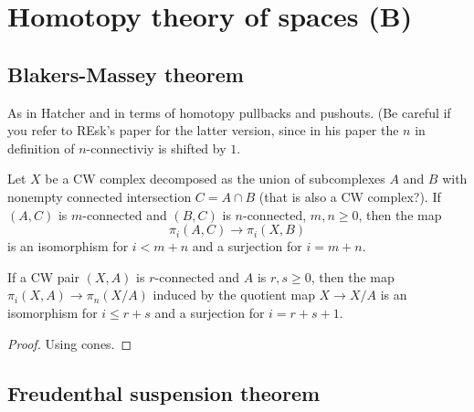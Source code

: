 \section{Homotopy theory of spaces (B)}
\label{section-homotopy-theory-of-spaces-b}

\subsection{Blakers-Massey theorem}
\label{subsection-blakers-massey-theorem}

As in Hatcher and in terms of homotopy
pullbacks and pushouts. (Be careful if you
refer to REsk's paper for the latter version,
since in his paper the $n$ in definition of
$n$-connectiviy is shifted by $1$.
\begin{theorem}
\label{theorem-blake-masse-hatch-4-23-tom}
	Let $X$ be a CW complex decomposed as the
	union of subcomplexes $A$ and $B$ with
	nonempty connected intersection $C=A\cap B$
	(that is also a CW complex?). If $(A,C)$ is
	$m$-connected and $(B,C)$ is $n$-connected,
	$m,n\geq 0$, then the map
	$$\pi_{i}(A,C)\to \pi_{i}(X,B)$$
is an isomorphism for $i<m+n$ and a
surjection for $i=m+n$.
\end{theorem}

\begin{proposition}
\label{proposition-quoti-theor-hatch-4}
	If a CW pair $(X,A)$ is $r$-connected and
	$A$ is $r,s \geq 0$, then the map
	$\pi_{i}(X,A)\to \pi_{n}(X/A)$ induced by
	the quotient map $X\to X/A$ is an
	isomorphism for $i\leq r+s$ and a surjection
	for $i=r+s+1$.
\end{proposition}
\begin{proof}
	Using cones.
\end{proof}

\subsection{Freudenthal suspension theorem}
\label{subsection-freud-suspe-theor}

